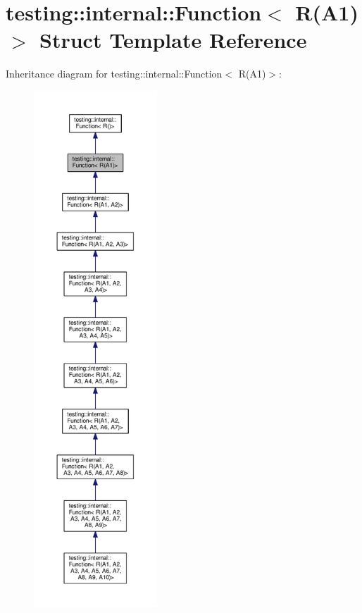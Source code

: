 \hypertarget{structtesting_1_1internal_1_1Function_3_01R_07A1_08_4}{}\section{testing\+:\+:internal\+:\+:Function$<$ R(A1)$>$ Struct Template Reference}
\label{structtesting_1_1internal_1_1Function_3_01R_07A1_08_4}


Inheritance diagram for testing\+:\+:internal\+:\+:Function$<$ R(A1)$>$\+:\nopagebreak
\begin{figure}[H]
\begin{center}
\leavevmode
\includegraphics[height=550pt]{structtesting_1_1internal_1_1Function_3_01R_07A1_08_4__inherit__graph}
\end{center}
\end{figure}


